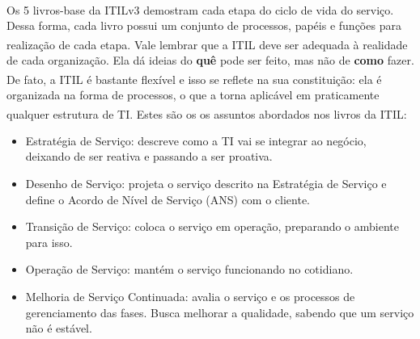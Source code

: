 Os 5 livros-base da ITIL\textsuperscript{\textregistered}v3 demostram cada
etapa do ciclo de vida do serviço. Dessa forma, cada livro possui um conjunto
de processos, papéis e funções para realização de cada etapa. Vale lembrar que
a ITIL\textsuperscript{\textregistered} deve ser adequada à realidade de cada
organização. Ela dá ideias do \textbf{quê} pode ser feito, mas não de
\textbf{como} fazer. De fato, a ITIL\textsuperscript{\textregistered} é
bastante flexível e isso se reflete na sua constituição: ela é organizada na
forma de processos, o que a torna aplicável em praticamente qualquer estrutura
de TI. Estes são os os assuntos abordados nos livros da
ITIL\textsuperscript{\textregistered}:
\begin{itemize}
    \item Estratégia de Serviço: descreve como a TI vai se integrar ao negócio,
        deixando de ser reativa e passando a ser proativa.
    \item Desenho de Serviço: projeta o serviço descrito na Estratégia de
        Serviço e define o Acordo de Nível de Serviço (ANS) com o cliente.
    \item Transição de Serviço: coloca o serviço em operação, preparando o
        ambiente para isso.
    \item Operação de Serviço: mantém o serviço funcionando no cotidiano.
    \item Melhoria de Serviço Continuada: avalia o serviço e os processos de
        gerenciamento das fases. Busca melhorar a qualidade, sabendo que um
        serviço não é estável.
\end{itemize}
